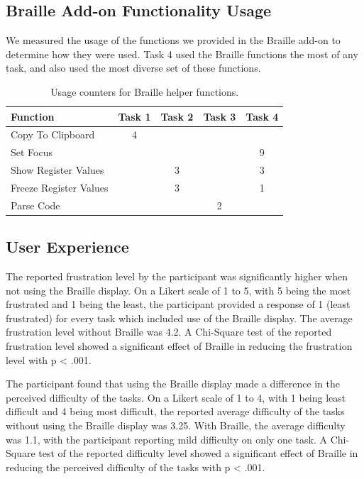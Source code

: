 \documentclass[11.5pt]{sig-alternate} %
\begin{document}
\begin{large}
\subsection*{Braille Add-on Functionality Usage}
 
We measured the usage of the functions we provided in the Braille add-on to determine how they were used. Task 4 used the Braille functions the most of any task, and also used the most diverse set of these functions. 

\begin{table}[h]
\caption{Usage counters for Braille helper functions.}
\begin{tabular}{lcccc}
\textbf{Function} & \textbf{Task 1} & \textbf{Task 2} & \textbf{Task 3} & \textbf{Task 4} \\ \hline
Copy To Clipboard & 4 &  &  & \\
Set Focus &  &  &  & 9 \\
Show Register Values &  & 3 &  & 3 \\
Freeze Register Values &  & 3 &  & 1 \\
Parse Code &  &  & 2  & \\ \hline
\end{tabular}
\end{table}

\subsection*{User Experience}

The reported frustration level by the participant was significantly higher when not using the Braille display. On a Likert scale of 1 to 5, with 5 being the most frustrated and 1 being the least, the participant provided a response of 1 (least frustrated) for every task which included use of the Braille display. The average frustration level without Braille was 4.2. A Chi-Square test of the reported frustration level showed a significant effect of Braille in reducing the frustration level with p < .001. 

The participant found that using the Braille display made a difference in the perceived difficulty of the tasks. On a Likert scale of 1 to 4, with 1 being least difficult and 4 being most difficult, the reported average difficulty of the tasks without using the Braille display was 3.25. With Braille, the average difficulty was 1.1, with the participant reporting mild difficulty on only one task. A Chi-Square test of the reported difficulty level showed a significant effect of Braille in reducing the perceived difficulty of the tasks with p < .001.


\end{large}
\end{document}
